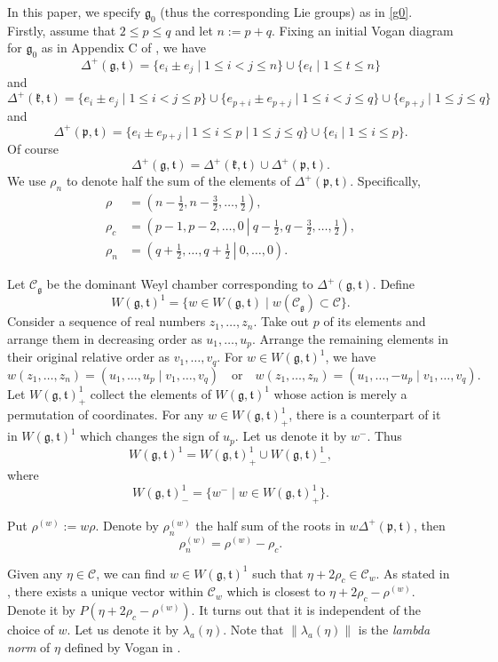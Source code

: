 \documentclass[11pt]{amsart}
\theoremstyle{plain}
\theoremstyle{definition}
\newcommand{\frg}{\mathfrak{g}}
\newcommand{\mfg}{\mathfrak{g}}
\newcommand{\mfk}{\mathfrak{k}}
\newcommand{\frp}{\mathfrak{p}}
\newcommand{\mfp}{\mathfrak{p}}
\newcommand{\frt}{\mathfrak{t}}
\newcommand{\mft}{\mathfrak{t}}
\newcommand{\C}{\mathcal{C}}
\begin{document}
In this paper, we specify $\frg_0$ (thus the corresponding Lie groups) as in \eqref{g0}.
Firstly, assume that $2\le p\le q$ and let $n:=p+q$. Fixing an initial Vogan diagram for $\frg_0$  as in Appendix C of \cite{Kn}, we have
	\[\Delta^+(\mfg,\mft)=\{e_i\pm e_j\mid 1\le i<j\le n\}\cup\{e_t\mid 1\le t\le n\}\]
and
	\[\Delta^+(\mfk,\mft)=\{e_i\pm e_j\mid 1\le i<j\le p\}\cup \{e_{p+i}\pm e_{p+j}\mid 1\le i<j\le q\}\cup\{e_{p+j}\mid 1\le j\le q\}\]
and
	\[\Delta^+(\mfp,\mft)=\{e_i\pm e_{p+j}\mid 1\le i\le p\mid 1\le j\le q\}\cup \{e_i\mid 1\le i\le p\}.\]
Of course
\[\Delta^+(\mfg,\mft)=\Delta^+(\mfk,\mft)\cup\Delta^+(\mfp,\mft).\]
We use $\rho_n$ to denote half the sum of the elements of $\Delta^+(\mfp,\mft)$. Specifically,
\begin{align*}
	\rho&=\left(n-\frac{1}{2},n-\frac{3}{2},\dots,\frac{1}{2}\right),\\
	\rho_c&=\left(p-1, p-2, \dots,  0\ \left|\  q-\frac{1}{2},q-\frac{3}{2},\dots,\frac{1}{2}\right)\right.,\\
	\rho_n&=\left.\left(q+\frac{1}{2},\dots,q+\frac{1}{2}\ \right|\  0,\dots,0\right).
\end{align*}

Let $\C_\mfg$ be the dominant Weyl chamber corresponding to $\Delta^+(\mfg,\mft)$.  Define
\[W(\mfg,\mft)^1=\{w\in W(\mfg,\mft)\mid w(\C_\mfg)\subset \C\}.\]
Consider a sequence of real numbers $z_1,\dots,z_n$. Take out $p$ of its elements and arrange them in decreasing order as $u_1,\dots,u_p$. Arrange the remaining elements in their original relative order as $v_1,\dots,v_q$. For $w\in W(\mfg,\mft)^1$, we have
\[w(z_1,\dots,z_n)=(u_1,\dots,u_p\mid v_1,\dots,v_q)\quad\mbox{or}\quad w(z_1,\dots,z_n)=(u_1,\dots,-u_p\mid v_1,\dots,v_q).\]
Let $W(\mfg,\mft)^1_+$ collect the elements of $W(\mfg,\mft)^1$ whose action is merely a permutation of coordinates. For any $w\in W(\mfg,\mft)^1_+$, there is a counterpart of it in $W(\mfg,\mft)^1$ which changes the sign of $u_p$. Let us denote it by $w^-$. Thus
\[W(\mfg,\mft)^1=W(\mfg,\mft)^1_+\cup W(\mfg,\mft)^1_-,\]
where
\[W(\mfg,\mft)^1_-=\{w^-\mid w\in W(\mfg,\mft)^1_+\}.\]

Put $\rho^{(w)}:=w\rho$. Denote by $\rho_n^{(w)}$ the half sum of the roots in $w\Delta^+(\frp,\frt)$, then
\[\rho_n^{(w)}=\rho^{(w)}-\rho_c.\]



Given any $\eta\in\mathcal{C}$, we can find $w\in W(\frg, \frt)^1$ such that $\eta+2\rho_c\in \mathcal{C}_{w}$. As stated in \cite{SV}, there exists a unique
vector within $\mathcal{C}_{w}$ which is closest to $\eta+2\rho_c-\rho^{(w)}$. Denote it by $P(\eta+2\rho_c-\rho^{(w)})$. It turns out that it is independent of the choice of $w$. Let us denote it by $\lambda_a(\eta)$. Note that
$\|\lambda_a(\eta)\|$ is the \emph{lambda norm} of $\eta$ defined by Vogan in \cite{V81}.
\end{document}
